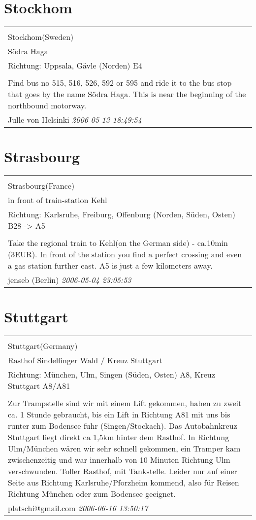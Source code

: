 \documentclass[a4paper,12pt]{article}
\begin{document}
\section{Stockhom}
\begin{tabular}{|p{13cm}|}
\hline\\
Stockhom(Sweden)\\
Södra Haga\\
Richtung: Uppsala, Gävle (Norden) E4 \\
\hline\\
Find bus no 515, 516, 526, 592 or 595 and ride it to the bus stop that goes by the name Södra Haga. This is near the beginning of the northbound motorway. \\
Julle von Helsinki \textit{ 2006-05-13 18:49:54 }\\\hline
\end{tabular}


\section{Strasbourg}
\begin{tabular}{|p{13cm}|}
\hline\\
Strasbourg(France)\\
in front of train-station Kehl\\
Richtung: Karlsruhe, Freiburg, Offenburg (Norden, Süden, Osten) B28 -> A5 \\
\hline\\
Take the regional train to Kehl(on the German side) - ca.10min (3EUR). In front of the station you find a perfect crossing and even a gas station further east. A5 is just a few kilometers away. \\
jenseb (Berlin) \textit{ 2006-05-04 23:05:53 }\\\hline
\end{tabular}


\section{Stuttgart}
\begin{tabular}{|p{13cm}|}
\hline\\
Stuttgart(Germany)\\
Rasthof Sindelfinger Wald / Kreuz Stuttgart\\
Richtung: München, Ulm, Singen (Süden, Osten) A8, Kreuz Stuttgart A8/A81 \\
\hline\\
Zur Trampstelle sind wir mit einem Lift gekommen, haben zu zweit ca. 1 Stunde gebraucht, bis ein Lift in Richtung A81 mit uns bis runter zum Bodensee fuhr (Singen/Stockach). Das Autobahnkreuz Stuttgart liegt direkt ca 1,5km hinter dem Rasthof. In Richtung Ulm/München wären wir sehr schnell gekommen, ein Tramper kam zwischenzeitig und war innerhalb von 10 Minuten Richtung Ulm verschwunden. Toller Rasthof, mit Tankstelle. Leider nur auf einer Seite aus Richtung Karlsruhe/Pforzheim kommend, also für Reisen Richtung München oder zum Bodensee geeignet. \\
platschi@gmail.com \textit{ 2006-06-16 13:50:17 }\\\hline
\end{tabular}
\end{document}
